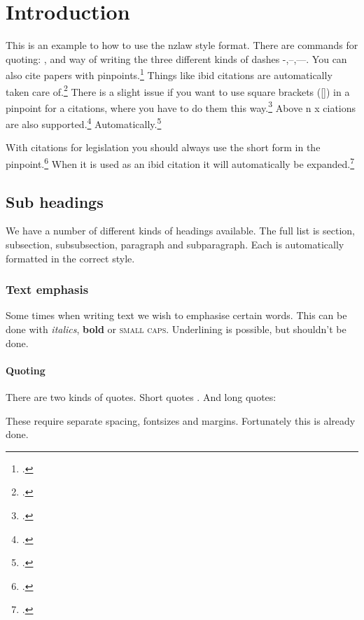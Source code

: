 \documentclass{nzlaw}
\begin{document}
\section{Introduction}
\label{sec:Introduction}

This is an example to how to use the nzlaw style format. 
There are commands for quoting: ,
and way of writing the three different kinds of dashes -,--,---.
You can also cite papers with pinpoints.\footcite[99]{astrazeneca}  
Things like ibid citations are automatically taken care 
of.\footcite[99]{astrazeneca} 
There is a slight issue if you want to use square brackets ([]) in a 
pinpoint for a citations, where you have to do them this
way.\footcite[22 and {[5]}]{astrazeneca} 
Above n x ciations are also supported.\footcite{z}
Automatically.\footcite[22]{astrazeneca} 

With citations for legislation you should always use the short
form in the pinpoint.\footcite[s 2]{gaming}
When it is used as an ibid citation it will automatically be 
expanded.\footcite[s 5]{gaming}

\subsection{Sub headings}
We have a number of different kinds of headings available. 
The full list is section, subsection, subsubsection, paragraph
and subparagraph. Each is automatically formatted in the correct 
style. 

\subsubsection{Text emphasis}
Some times when writing text we wish to emphasise certain words.
This can be done with \emph{italics}, \textbf{bold} or \textsc{small
caps}. Underlining is possible, but shouldn't be done.

\paragraph{Quoting}

There are two kinds of quotes. Short quotes . And long quotes:

\begin{longquote}
These require separate spacing, fontsizes and margins. Fortunately
this is already done.
\end{longquote}
\end{document}
